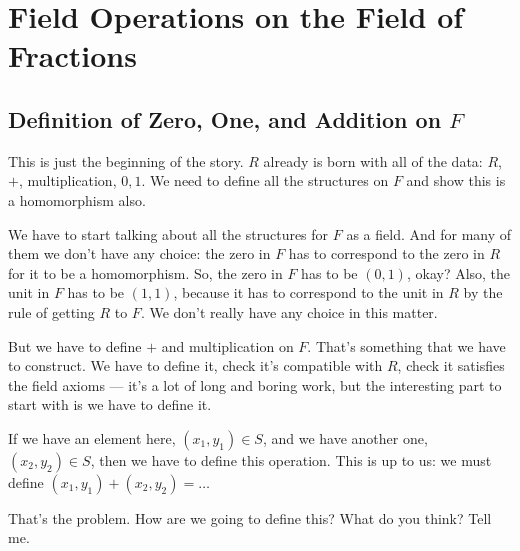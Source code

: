 \section{Field Operations on the Field of Fractions}

\subsection{Definition of Zero, One, and Addition on \texorpdfstring{$F$}{F}}

\begin{speech}[00:57:05 - 00:58:38]
This is just the beginning of the story. $R$ already is born with all of the data: $R$, $+$, multiplication, $0, 1$.  We need to define all the structures on $F$ and show this is a homomorphism also. 

We have to start talking about all the structures for $F$ as a field. And for many of them we don't have any choice: the zero in $F$ has to correspond to the zero in $R$ for it to be a homomorphism. So, the zero in $F$ has to be $(0, 1)$,  okay? Also, the unit in $F$ has to be $(1, 1)$,  because it has to correspond to the unit in $R$ by the rule of getting $R$ to $F$. We don't really have any choice in this matter.

But we have to define $+$ and multiplication on $F$.  That's something that we have to construct. We have to define it, check it's compatible with $R$, check it satisfies the field axioms --- it's a lot of long and boring work, but the interesting part to start with is we have to define it.

If we have an element here, $(x_1, y_1) \in S$,  and we have another one, $(x_2, y_2) \in S$,  then we have to define this operation. This is up to us: we must define $(x_1, y_1) + (x_2, y_2) = \dots$  

That's the problem. How are we going to define this? What do you think? Tell me.
\end{speech}

